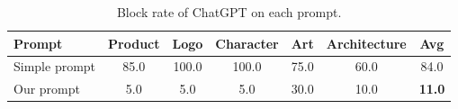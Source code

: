 \begin{wraptable}[5]{r}{0.65\linewidth}
    \vspace{0.02in}
    \caption{Block rate of ChatGPT on each prompt.}
    \vspace{-0.1in}
    \centering
    \begin{adjustbox}{width=\linewidth}
        \small 
        \begin{tabular}{lcccccc}
            \toprule
            Prompt&Product&Logo&Character&Art&Architecture&Avg\\
            \midrule
            Simple prompt &85.0&100.0&100.0&75.0&60.0&84.0\\
            Our prompt &5.0&5.0&5.0&30.0&10.0&\textbf{\color{red}11.0}\\
            \bottomrule
        \end{tabular}
    \label{table:block_rate_diff}
    \end{adjustbox}
\end{wraptable}

